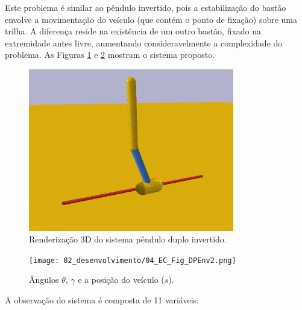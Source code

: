 Este problema é similar ao pêndulo invertido, pois a estabilização do bastão envolve a movimentação do veículo (que contém o ponto de fixação) sobre uma trilha. A diferença reside na existência de um outro bastão, fixado na extremidade antes livre, aumentando consideravelmente a complexidade do problema. As Figuras \ref{fig:4ec-dpenv} e \ref{fig:4ec-dpenv2} mostram o sistema proposto.

\begin{figure}[H]
	\centering
	\includegraphics[width=0.8\textwidth]{02_desenvolvimento/04_EC_Fig_DPEnv.png}
	\caption{Renderização 3D do sistema pêndulo duplo invertido.}
	\label{fig:4ec-dpenv}
\end{figure}

\begin{figure}[H]
	\centering
	\texttt{[image: 02\_desenvolvimento/04\_EC\_Fig\_DPEnv2.png]}
	\caption{Ângulos $\theta$, $\gamma$ e a posição do veículo ($s$).}
	\label{fig:4ec-dpenv2}
\end{figure}

A observação do sistema é composta de 11 variáveis:

